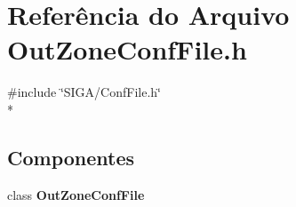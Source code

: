 \section{Referência do Arquivo Out\+Zone\+Conf\+File.\+h}
\label{_out_zone_conf_file_8h}
{\ttfamily \#include \char`\"{}S\+I\+G\+A/\+Conf\+File.\+h\char`\"{}}\\*
\subsection*{Componentes}
\begin{DoxyCompactItemize}
\item 
class {\bf Out\+Zone\+Conf\+File}
\end{DoxyCompactItemize}
